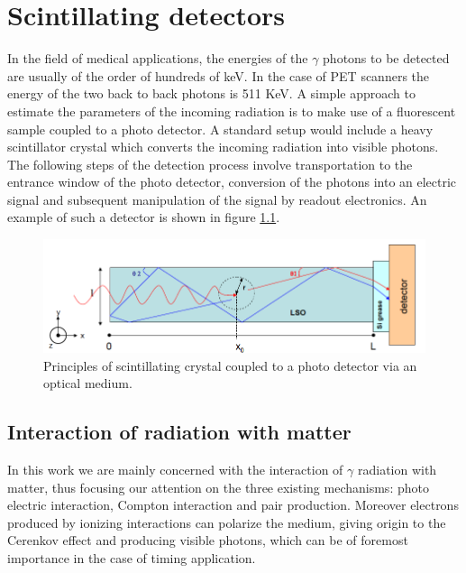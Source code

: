 

\chapter{Scintillating detectors}

In the field of medical applications, the energies of the $\gamma$ photons to be detected are usually of the order of hundreds of keV. In the case of PET scanners the energy of the two back to back photons is 511 KeV.
A simple approach to estimate the parameters of the incoming radiation is to make use of a fluorescent sample coupled to a photo detector. A standard setup would include a heavy scintillator crystal which converts the incoming radiation into visible photons. The following steps of the detection process involve transportation to the entrance window of the photo detector, conversion of the photons into an electric signal and subsequent manipulation of the signal by readout electronics. An example of such a detector is shown in figure \ref{fig:detector_struct}.

\begin{figure}
\centering
\includegraphics[width=12cm]{../Pictures/Chapter_2/detector.png}
\caption[Principles of scintillating detectors]{Principles of scintillating crystal coupled to a photo detector via an optical medium.}
\label{fig:detector_struct}
\end{figure}

\section{Interaction of radiation with matter}
In this work we are mainly concerned with the interaction of $\gamma$ radiation with matter, thus focusing our attention on the three existing mechanisms: photo electric interaction, Compton interaction and pair production.
Moreover electrons produced by ionizing interactions can polarize the medium, giving origin to the Cerenkov effect and producing visible photons, which can be of foremost importance in the case of timing application.

